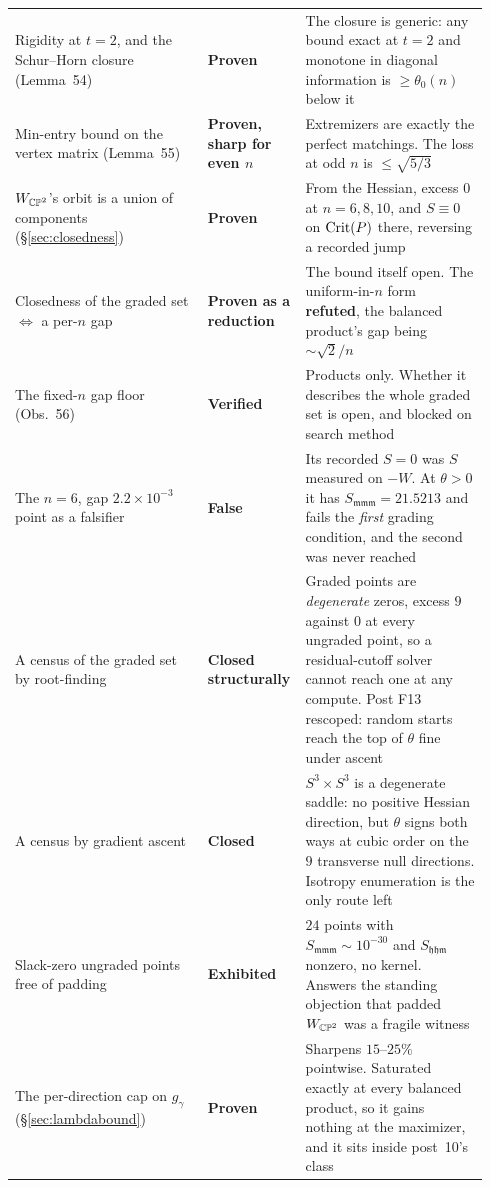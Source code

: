 \begin{longtable}{@{}p{0.40\linewidth}p{0.16\linewidth}p{0.38\linewidth}@{}}
Rigidity at $t=2$, and the Schur--Horn closure (Lemma~54) & \textbf{Proven} & The closure is generic: any bound exact at $t=2$ and monotone in diagonal information is $\ge\theta_0(n)$ below it \\
Min-entry bound on the vertex matrix (Lemma~55) & \textbf{Proven, sharp for even $n$} & Extremizers are exactly the perfect matchings. The loss at odd $n$ is $\le\sqrt{5/3}$ \\
$W_{\mathbb{CP}^2}$'s orbit is a union of components (\S\ref{sec:closedness}) & \textbf{Proven} & From the Hessian, excess $0$ at $n=6,8,10$, and $S\equiv0$ on $\mathrm{Crit}(P)$ there, reversing a recorded jump \\
Closedness of the graded set $\iff$ a per-$n$ gap & \textbf{Proven as a reduction} & The bound itself open. The uniform-in-$n$ form \textbf{refuted}, the balanced product's gap being $\sim\sqrt2/n$ \\
The fixed-$n$ gap floor (Obs.~56) & \textbf{Verified} & Products only. Whether it describes the whole graded set is open, and blocked on search method \\
The $n=6$, gap $2.2\times10^{-3}$ point as a falsifier & \textbf{False} & Its recorded $S=0$ was $S$ measured on $-W$. At $\theta>0$ it has $S_{\mathfrak{mmm}}=21.5213$ and fails the \emph{first} grading condition, and the second was never reached \\
A census of the graded set by root-finding & \textbf{Closed structurally} & Graded points are \emph{degenerate} zeros, excess $9$ against $0$ at every ungraded point, so a residual-cutoff solver cannot reach one at any compute. Post F13 rescoped: random starts reach the top of $\theta$ fine under ascent \\
A census by gradient ascent & \textbf{Closed} & $S^3\times S^3$ is a degenerate saddle: no positive Hessian direction, but $\theta$ signs both ways at cubic order on the $9$ transverse null directions. Isotropy enumeration is the only route left \\
Slack-zero ungraded points free of padding & \textbf{Exhibited} & $24$ points with $S_{\mathfrak{mmm}}\sim10^{-30}$ and $S_{\mathfrak{hhm}}$ nonzero, no kernel. Answers the standing objection that padded $W_{\mathbb{CP}^2}$ was a fragile witness \\
The per-direction cap on $g_\gamma$ (\S\ref{sec:lambdabound}) & \textbf{Proven} & Sharpens $15$--$25\%$ pointwise. Saturated exactly at every balanced product, so it gains nothing at the maximizer, and it sits inside post~10's class \\

\end{longtable}
